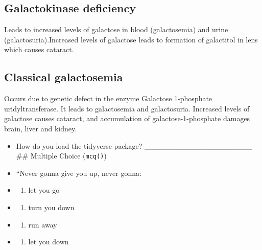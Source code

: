 \documentclass[
]{book}
\providecommand{\tightlist}{%
  \setlength{\itemsep}{0pt}\setlength{\parskip}{0pt}}
\begin{document}
\subsection{Galactokinase deficiency}\label{galactokinase-deficiency}

Leads to increased levels of galactose in blood (galactosemia) and urine (galactosuria).Increased levels of galactose leads to formation of galactitol in lens which causes cataract.

\subsection{Classical galactosemia}\label{classical-galactosemia}

Occurs due to genetic defect in the enzyme Galactose 1-phosphate uridyltransferase. It leads to galactosemia and galactosuria. Increased levels of galactose causes cataract, and accumulation of galactose-1-phosphate damages brain, liver and kidney.

\begin{itemize}
\item
  How do you load the tidyverse package? \_\_\_\_\_\_\_\_\_\_\_\_\_\_\_\_\_\_\_\_
  \#\# Multiple Choice (\texttt{mcq()})
\item
  ``Never gonna give you up, never gonna:
\item
  \begin{enumerate}
  \def\labelenumi{(\Alph{enumi})}
  \tightlist
  \item
    let you go\\
  \end{enumerate}
\item
  \begin{enumerate}
  \def\labelenumi{(\Alph{enumi})}
  \setcounter{enumi}{1}
  \tightlist
  \item
    turn you down\\
  \end{enumerate}
\item
  \begin{enumerate}
  \def\labelenumi{(\Alph{enumi})}
  \setcounter{enumi}{2}
  \tightlist
  \item
    run away\\
  \end{enumerate}
\item
  \begin{enumerate}
  \def\labelenumi{(\Alph{enumi})}
  \setcounter{enumi}{3}
  \tightlist
  \item
    let you down
  \end{enumerate}
\end{itemize}
\end{document}
